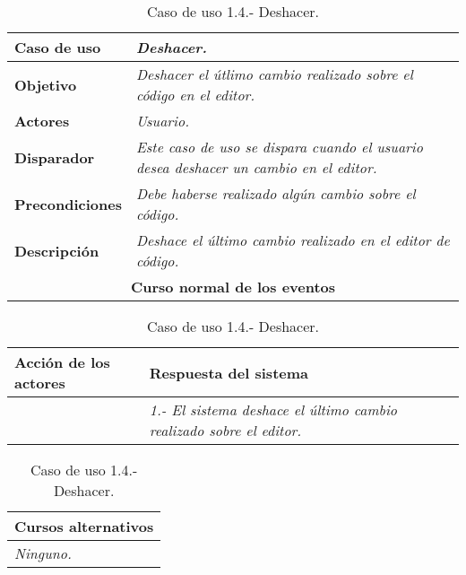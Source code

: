    \begin{table}[!ht] %
      \centering
      \begin{tabular}{|p{4cm}|p{11.5cm}|}
      \hline
      \textbf{Caso de uso} & \textit{Deshacer.}\\ \hline
      \textbf{Objetivo} & \textit{Deshacer el útlimo cambio realizado sobre el código en el editor.}\\ \hline
      \textbf{Actores} & \textit{Usuario.}\\ \hline 
      \textbf{Disparador} & \textit{Este caso de uso se dispara cuando el usuario desea deshacer un cambio en el editor.}\\ \hline
      \textbf{Precondiciones} & \textit{Debe haberse realizado algún cambio sobre el código.}\\ \hline
      \textbf{Descripción} & \textit{Deshace el último cambio realizado en el editor de código.}\\ \hline
      \multicolumn{2}{|c|}{\textbf{Curso normal de los eventos}}\\ \hline
    \end{tabular}
    \begin{tabular}{|p{7.75cm}|p{7.75cm}|}
      \hspace{2cm}\textbf{Acción de los actores} & \hspace{1.75cm}\textbf{Respuesta del sistema}\\ \hline
            & \textit{1.- El sistema deshace el último cambio realizado sobre el editor.} \\ \hline
    \end{tabular}
    \begin{tabular}{|p{15.9cm}|}
      \hspace{6cm}\textbf{Cursos alternativos}\\ \hline     
      \textit{Ninguno.} \\ \hline
    \end{tabular}
    \caption{Caso de uso 1.4.- Deshacer.}
   \end{table}


